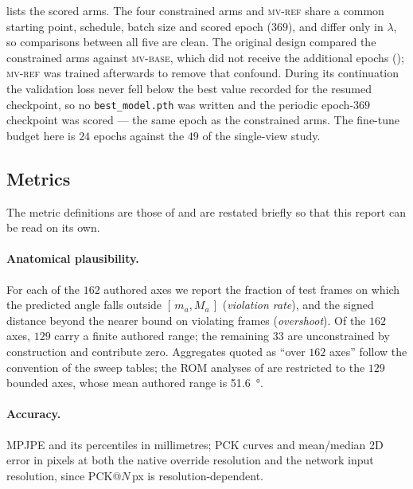 \documentclass[11pt,a4paper]{article}
\newcommand{\lam}{\lambda}
\newcommand{\armref}{\textsc{mv-ref}}
\newcommand{\armbase}{\textsc{mv-base}}
\begin{document}
 lists the scored arms. The four constrained arms and \armref{}
share a common starting point, schedule, batch size and scored epoch ($369$),
and differ only in $\lam$, so comparisons between all five are clean. The
original design compared the constrained arms against \armbase{}, which did not
receive the additional epochs (); \armref{} was trained
afterwards to remove that confound. During its continuation the validation loss
never fell below the best value recorded for the resumed checkpoint, so no
\texttt{best\_model.pth} was written and the periodic epoch-$369$ checkpoint
was scored --- the same epoch as the constrained arms. The fine-tune budget
here is $24$ epochs against the $49$ of the single-view study.

\subsection{Metrics}
\label{sec:metrics}

The metric definitions are those of \cite{sv} and are restated briefly so that
this report can be read on its own.

\paragraph{Anatomical plausibility.}
For each of the $162$ authored axes we report the fraction of test frames on
which the predicted angle falls outside $[\,m_a, M_a\,]$ (\emph{violation
rate}), and the signed distance beyond the nearer bound on violating frames
(\emph{overshoot}). Of the $162$ axes, $129$ carry a finite authored range; the
remaining $33$ are unconstrained by construction and contribute zero.
Aggregates quoted as ``over $162$ axes'' follow the convention of the sweep
tables; the ROM analyses of  are restricted to the $129$
bounded axes, whose mean authored range is \SI{51.6}{\degree}.

\paragraph{Accuracy.}
MPJPE and its percentiles in millimetres; PCK curves and mean/median 2D error
in pixels at both the native override resolution and the network input
resolution, since PCK@$N$\,px is resolution-dependent.
\end{document}
